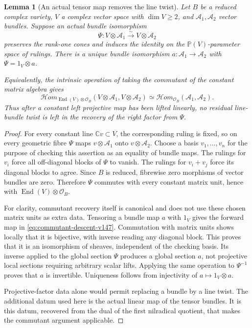 \documentclass[11pt,reqno]{amsart}
\numberwithin{equation}{section}
\newtheorem{lemma}[theorem]{Lemma}
\theoremstyle{definition}\newtheorem{definition}[theorem]{Definition}
\theoremstyle{remark}\newtheorem{remark}[theorem]{Remark}
\newcommand{\C}{\mathbb C}\newcommand{\Q}{\mathbb Q}
\newcommand{\Pj}{\mathbb P}\newcommand{\A}{\mathbb A}
\newcommand{\OO}{\mathcal O}\newcommand{\II}{\mathcal I}
\DeclareMathOperator{\End}{End}
\begin{document}
\begin{lemma}[An actual tensor map removes the line twist]
\label{lem:actual-factor-descent-v147}
Let \(B\) be a reduced complex variety, \(V\) a complex vector
space with \(\dim V\ge2\), and \(\mathcal A_1,\mathcal A_2\)
vector bundles.  Suppose an actual bundle isomorphism
\[
 \Psi:V\otimes\mathcal A_1\xrightarrow{\sim}V\otimes\mathcal A_2
\]
preserves the rank-one cones and induces the identity on the
\(\Pj(V)\)-parameter space of rulings.  There is a unique bundle
isomorphism \(a:\mathcal A_1\to\mathcal A_2\) with
\(\Psi=1_V\otimes a\).

Equivalently, the intrinsic operation of taking the commutant of the
constant matrix algebra gives
\begin{equation}\label{eq:commutant-descent-v147}
 \mathcal Hom_{\End(V)\otimes\OO_B}
       (V\otimes\mathcal A_1,V\otimes\mathcal A_2)
             \simeq\mathcal Hom_{\OO_B}(\mathcal A_1,\mathcal A_2).
\end{equation}
Thus after a constant left projective map has been lifted linearly,
no residual line-bundle twist is left in the recovery of the right
factor from \(\Psi\).
\end{lemma}
\begin{proof}
For every constant line \(\C v\subset V\), the corresponding
ruling is fixed, so on every geometric fibre \(\Psi\) maps
\(v\otimes\mathcal A_1\) onto \(v\otimes\mathcal A_2\).
Choose a basis \(v_1,\ldots,v_n\) for the purpose of checking
this assertion as an equality of bundle maps.  The rulings for
\(v_i\) force all off-diagonal blocks of \(\Psi\) to vanish.
The rulings for \(v_i+v_j\) force its diagonal blocks to agree.
Since \(B\) is reduced, fibrewise zero morphisms of vector bundles
are zero.  Therefore \(\Psi\) commutes with every constant
matrix unit, hence with \(\End(V)\otimes\OO_B\).

For clarity, commutant recovery itself is canonical and does not
use these chosen matrix units as extra data.  Tensoring a bundle
map \(a\) with \(1_V\) gives the forward map in
\eqref{eq:commutant-descent-v147}.  Commutation with matrix units
shows locally that it is bijective, with inverse reading any diagonal
block.  This proves that it is an isomorphism of sheaves, independent
of the checking basis.  Its inverse applied to the global section
\(\Psi\) produces a global section \(a\), not projective local
sections requiring arbitrary scalar lifts.  Applying the same
operation to \(\Psi^{-1}\) proves that \(a\) is invertible.
Uniqueness follows from injectivity of \(a\mapsto1_V\otimes a\).

Projective-factor data alone would permit replacing a bundle by a
line twist.  The additional datum used here is the actual linear map
of the tensor bundles.  It is this datum, recovered from the dual of
the first nilradical quotient, that makes the commutant argument
applicable.
\end{proof}
\end{document}
